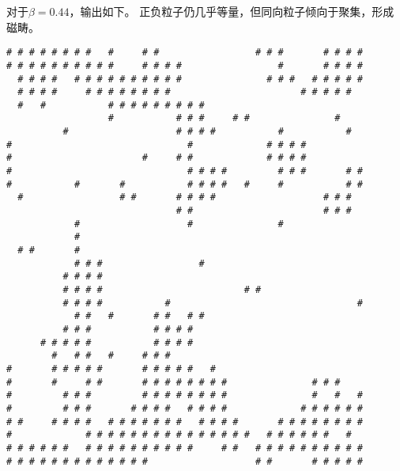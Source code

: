 \documentclass[a4paper,unicode]{report}
\begin{document}
对于$\beta=0.44$，输出如下。
正负粒子仍几乎等量，但同向粒子倾向于聚集，形成磁畴。
{
\linespread{0.7}
\scriptsize
\begin{verbatim}
# # # # # # # #   #     # #                 # # #       # # # #
# # # # # # # # # #     # # # #                 #       # # # #
  # # # #   # # # # # # # # # #               # # #   # # # # #
  # # # #     # # # # # # # #                       # # # # #
  #   #           # # # # # # # # #
                  #           # # #     # #               #
          #                   # # # #           #           #
#                               #             # # # #
#                       #     # #             # # # #
#                               # # # #         # # #       # #
#           #       #           # # # #   #     #           # #
  #                 # #       # # # #                   # # #
                              # #                       # # #
            #                   #               #
            #
  # #       #
            # # #                 #
          # # # #
          # # # #                         # #
          # # # #           #                                 #
            # #   #       # #   # #
          # # #           # # # #
      # # # # #           # # # #
        #   # #   #     # # #
#       # # # # #       # # # # #   #
#       #     # #       # # # # # # # #               # # #
#         # # #         # # # # # # # #               #   #   #
#         # # #       # # # #   # # # #             # # # # # #
# #     # # # #   # # # # # # #   # # # #       # # # # # # # #
#             # # # # # # # # # # # # # # #   # # # # # #   #
# # # # # #   # # # # # # # # # #     # #   # # # # # # # # # #
# # # # # # # # # # # # #                   # #       # # # # #
\end{verbatim}
}
\end{document}

